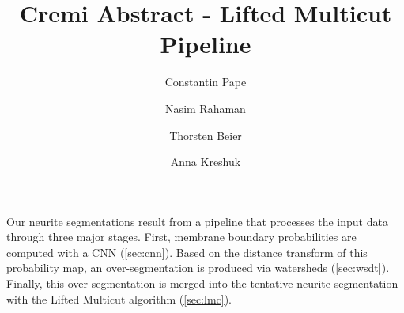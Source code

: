 \documentclass[runningheads,a4paper]{llncs}
\begin{document}


\title{Cremi Abstract - Lifted Multicut Pipeline}

\author{Constantin Pape \and Nasim Rahaman \and Thorsten Beier \and Anna Kreshuk}

%
\iffalse
\author{Firstname Lastname\inst{1} \and Firstname Lastname\inst{2} }

\institute{
Insitute 1\\
\email{...}\and
Insitute 2\\
\email{...}
}
\fi
			
\maketitle

%


%
%
%

Our neurite segmentations result from a pipeline that processes the input data through three major stages.
First, membrane boundary probabilities are computed with a CNN (\cref{sec:cnn}). Based on the distance transform of this probability map, an over-segmentation is produced via watersheds (\cref{sec:wsdt}).
Finally, this over-segmentation is merged into the tentative neurite segmentation with the Lifted Multicut algorithm (\cref{sec:lmc}).
\end{document}
